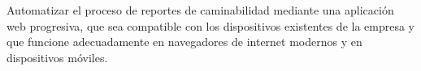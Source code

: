 Automatizar el proceso de reportes de caminabilidad mediante una aplicación web progresiva, que sea compatible con los dispositivos existentes de la empresa y que funcione adecuadamente en navegadores de internet modernos y en dispositivos móviles.
